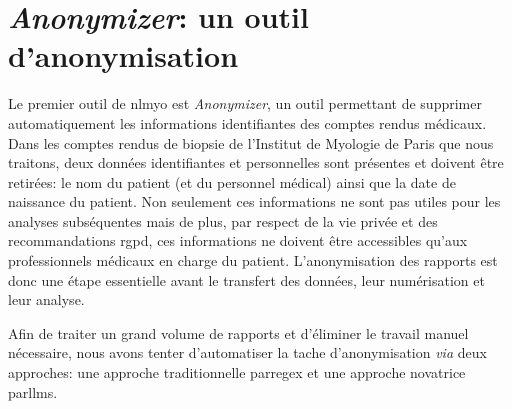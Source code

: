 \section{\textit{Anonymizer}: un outil d'anonymisation}
Le premier outil de \gls{nlmyo} est \textit{Anonymizer}, un outil permettant de supprimer automatiquement les informations identifiantes des comptes rendus médicaux. Dans les comptes rendus de biopsie de l'Institut de Myologie de Paris que nous traitons, deux données identifiantes et personnelles sont présentes et doivent être retirées: le nom du patient (et du personnel médical) ainsi que la date de naissance du patient. Non seulement ces informations ne sont pas utiles pour les analyses subséquentes mais de plus, par respect de la vie privée et des recommandations \gls{rgpd}, ces informations ne doivent être accessibles qu'aux professionnels médicaux en charge du patient. L'anonymisation des rapports est donc une étape essentielle avant le transfert des données, leur numérisation et leur analyse.

Afin de traiter un grand volume de rapports et d'éliminer le travail manuel nécessaire, nous avons tenter d'automatiser la tache d'anonymisation \textit{via} deux approches: une approche traditionnelle par\gls{regex} et une approche novatrice par\gls{llms}.

